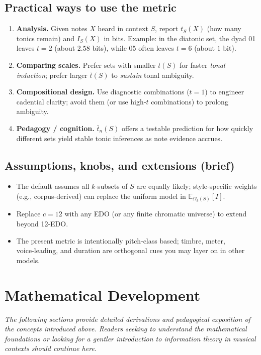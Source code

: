 \documentclass[10pt,twocolumn]{article}
\numberwithin{equation}{section} %
\begin{document}
    \subsection*{Practical ways to use the metric}
    \begin{enumerate}
        \item \textbf{Analysis.} Given notes $X$ heard in context $S$, report $t_S(X)$ (how many tonics remain) and $I_S(X)$ in bits. Example: in the diatonic set, the dyad 01 leaves $t{=}2$ (about $2.58$ bits), while 05 often leaves $t{=}6$ (about $1$ bit).
        \item \textbf{Comparing scales.} Prefer sets with smaller $\bar{t}(S)$ for faster \emph{tonal induction}; prefer larger $\bar{t}(S)$ to \emph{sustain} tonal ambiguity.
        \item \textbf{Compositional design.} Use diagnostic combinations ($t{=}1$) to engineer cadential clarity; avoid them (or use high‑$t$ combinations) to prolong ambiguity.
        \item \textbf{Pedagogy / cognition.} $\bar{t}_n(S)$ offers a testable prediction for how quickly different sets yield stable tonic inferences as note evidence accrues.
    \end{enumerate}

    \subsection*{Assumptions, knobs, and extensions (brief)}
    \begin{itemize}
        \item The default assumes all $k$‑subsets of $S$ are equally likely; style‑specific weights (e.g., corpus‑derived) can replace the uniform model in $\mathbb{E}_{\Omega_k(S)}[I]$.
        \item Replace $c{=}12$ with any EDO (or any finite chromatic universe) to extend beyond 12‑EDO.
        \item The present metric is intentionally pitch‑class based; timbre, meter, voice‑leading, and duration are orthogonal cues you may layer on in other models.
    \end{itemize}


    \section{Mathematical Development}\label{sec:math-dev}

    \textit{The following sections provide detailed derivations and pedagogical exposition of the concepts introduced above. Readers seeking to understand the mathematical foundations or looking for a gentler introduction to information theory in musical contexts should continue here.}
\end{document}
